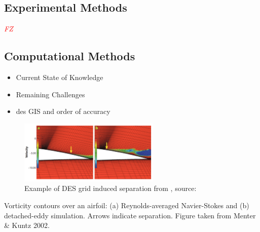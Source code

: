 \documentclass[journal]{new-aiaa}
\begin{document}
\subsection{Experimental Methods} \label{subsec:currentstateexperimental}

\textcolor{red}{\emph{FZ}}


\subsection{Computational Methods} \label{subsec:currentstatecomputational}



\begin{itemize}
    \item Current State of Knowledge
    \item Remaining Challenges
    \item des GIS and order of accuracy
\end{itemize}








\begin{figure}[H]
\begin{center}
\includegraphics[width=0.6\textwidth]{Images/logan/spalart2009detachededdy_GridInducedSeparation.pdf}
\caption{ Example of DES grid induced separation from \cite{spalart2009detachededdy}, source: \cite{menter2004adaptation} }
\label{fig:desgridinducedseparation}
\end{center}
\end{figure}

Vorticity contours over an airfoil: (a) Reynolds-averaged Navier-Stokes and (b) detached-eddy simulation.
Arrows indicate separation. Figure taken from Menter \& Kuntz 2002.
\end{document}
